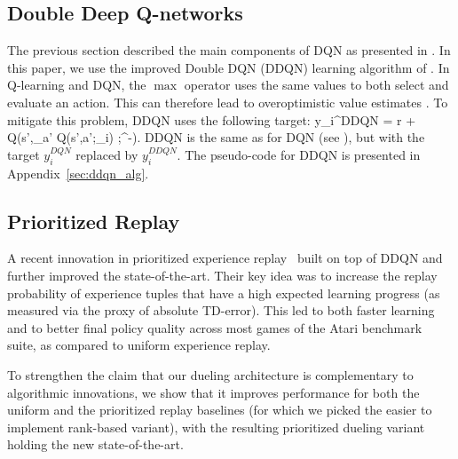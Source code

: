 \subsection{Double Deep Q-networks} %

The previous section described the main components of DQN as presented in \citep{Mnih:2015}. In this paper, we use the improved Double DQN (DDQN) learning algorithm of \citet{vanHasselt:2015}. In Q-learning and DQN, the $\max$ operator
uses the same values to both select and evaluate an action. This can therefore lead to overoptimistic value estimates \citep{vanHasselt:2010}. To mitigate this problem, DDQN uses the following target:
\be
y_i^{DDQN} =  r + \gamma Q(s',\argmax_{a'} Q(s',a';\theta_i)   ;\theta^{-}).
\ee
DDQN is the same as for DQN (see \citet{Mnih:2015}), but with the target $y_i^{DQN}$ replaced by $ y_i^{DDQN}$.
The pseudo-code for DDQN is presented in Appendix~\ref{sec:ddqn_alg}.


\subsection{Prioritized Replay}

A recent innovation in prioritized experience replay~\citep{Schaul:2015} built on top of DDQN and further improved the state-of-the-art. Their key idea was to increase the replay probability of experience tuples that have a high expected learning progress (as measured via the proxy of absolute TD-error). This led to both faster learning and to better final policy quality across most games of the Atari benchmark suite, as compared to uniform experience replay.

To strengthen the claim that our dueling architecture is complementary to algorithmic innovations, we show that it improves performance for both the uniform and the prioritized replay baselines (for which we picked the easier to implement rank-based variant), with the resulting prioritized dueling variant holding the new state-of-the-art. 


